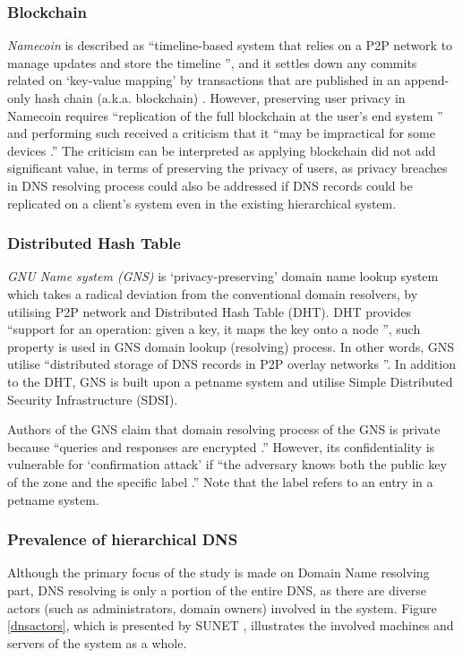 \subsubsection{Blockchain}
\textit{Namecoin} \cite{loibl2014namecoin} is described as ``timeline-based system that relies on a P2P network to manage updates and store the timeline \cite{grothoff2017nsa}'', and it settles down any commits related on `key-value mapping' by transactions that are published in an append-only hash chain (a.k.a. blockchain) \cite{kalodner2015empirical}.
However, preserving user privacy in Namecoin requires ``replication of the full blockchain at the user's end system \cite{grothoff2017nsa}'' and performing such received a criticism that it ``may be impractical for some devices \cite{grothoff2017nsa}.''
The criticism can be interpreted as applying blockchain did not add significant value, in terms of preserving the privacy of users, as privacy breaches in DNS resolving process could also be addressed if DNS records could be replicated on a client's system even in the existing hierarchical system. 

\subsubsection{Distributed Hash Table}
\textit{GNU Name system (GNS)} is `privacy-preserving' domain name lookup system which takes a radical deviation from the conventional domain resolvers, by utilising P2P network and Distributed Hash Table (DHT).
DHT provides ``support for an operation: given a key, it maps the key onto a node \cite{stoica2001chord}'', such property is used in GNS domain lookup (resolving) process. 
In other words, GNS utilise ``distributed storage of DNS records in P2P overlay networks \cite{wachs2014censorship}''. In addition to the DHT, GNS is built upon a petname system \cite{stiegler2005introduction} and utilise Simple Distributed Security Infrastructure (SDSI).

Authors of the GNS claim that domain resolving process of the GNS is private because ``queries and responses are encrypted \cite{grothoff2017nsa, wachs2014censorship}.''
However, its confidentiality is vulnerable for `confirmation attack' if ``the adversary knows both the public key of the zone and the specific label \cite{wachs2014censorship}.'' Note that the label refers to an entry in a petname system. 

\subsubsection{Prevalence of hierarchical DNS}
Although the primary focus of the study is made on Domain Name resolving part, DNS resolving is only a portion of the entire DNS, as there are diverse actors (such as administrators, domain owners) involved in the system.
Figure \ref{dnsactors}, which is presented by SUNET \cite{SUNET-DNS}, illustrates the involved machines and servers of the system as a whole.


